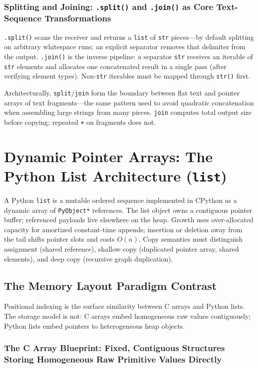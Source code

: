 \documentclass[a4paper,twoside]{report}
\begin{document}
\subsubsection{Splitting and Joining: \texttt{.split()} and \texttt{.join()} as Core Text-Sequence Transformations}

\texttt{.split()} scans the receiver and returns a \texttt{list} of \texttt{str} pieces---by default splitting on arbitrary whitespace runs; an explicit separator removes that delimiter from the output. \texttt{.join()} is the inverse pipeline: a separator \texttt{str} receives an iterable of \texttt{str} elements and allocates one concatenated result in a single pass (after verifying element types). Non-\texttt{str} iterables must be mapped through \texttt{str()} first.

Architecturally, \texttt{split}/\texttt{join} form the boundary between flat text and pointer arrays of text fragments---the same pattern used to avoid quadratic concatenation when assembling large strings from many pieces. \texttt{join} computes total output size before copying; repeated \texttt{+} on fragments does not.


\section{Dynamic Pointer Arrays: The Python List Architecture (\texttt{list})}

A Python \texttt{list} is a mutable ordered sequence implemented in CPython as a dynamic array of \texttt{PyObject*} references. The list object owns a contiguous pointer buffer; referenced payloads live elsewhere on the heap. Growth uses over-allocated capacity for amortized constant-time appends; insertion or deletion away from the tail shifts pointer slots and costs $O(n)$. Copy semantics must distinguish assignment (shared reference), shallow copy (duplicated pointer array, shared elements), and deep copy (recursive graph duplication).


\subsection{The Memory Layout Paradigm Contrast}

Positional indexing is the surface similarity between C arrays and Python lists. The storage model is not: C arrays embed homogeneous raw values contiguously; Python lists embed pointers to heterogeneous heap objects.

\subsubsection{The C Array Blueprint: Fixed, Contiguous Structures Storing Homogeneous Raw Primitive Values Directly}
\end{document}

